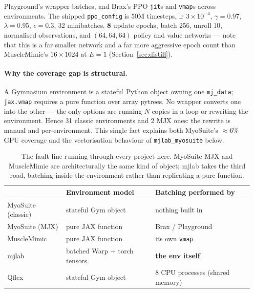 \documentclass[11pt,a4paper]{article}
\begin{document}
\noindent
Playground's wrapper batches, and Brax's PPO \texttt{jit}s and \texttt{vmap}s across
environments. The shipped \texttt{ppo\_config} is 50M timesteps, lr $3\times10^{-4}$,
$\gamma=0.97$, $\lambda=0.95$, $\epsilon=0.3$, 32 minibatches, \textbf{8} update epochs,
batch 256, unroll 10, normalised observations, and $(64,64,64)$ policy and value networks
--- note that this is a far smaller network and a far more aggressive epoch count than
MuscleMimic's $16\times1024$ at $E=1$ (Section~\ref{sec:distill}).

\paragraph{Why the coverage gap is structural.} A Gymnasium environment is a stateful Python
object owning one \texttt{mj\_data}; \texttt{jax.vmap} requires a pure function over array
pytrees. No wrapper converts one into the other --- the only options are running $N$ copies
in a loop or rewriting the environment. Hence 31 classic environments and 2 MJX ones: the
rewrite is manual and per-environment. This single fact explains both MyoSuite's $\approx$6\%
GPU coverage and the vectorisation behaviour of \texttt{mjlab\_myosuite} below.

\begin{table}[h!]
\centering
\small
\begin{tabular}{@{}L{4.2cm}L{4.4cm}L{4.0cm}@{}}
\toprule
 & Environment model & Batching performed by \\
\midrule
MyoSuite (classic)   & stateful Gym object & nothing built in \\
MyoSuite (MJX)       & pure JAX function & Brax / Playground \\
\textcolor{mmC}{MuscleMimic} & pure JAX function & its own \texttt{vmap} \\
\textcolor{mjC}{mjlab}       & batched Warp + torch tensors & \textbf{the env itself} \\
\textcolor{qfC}{Qflex}       & stateful Gym object & 8 CPU processes (shared memory) \\
\bottomrule
\end{tabular}
\caption{The fault line running through every project here. MyoSuite-MJX and MuscleMimic are
architecturally the same kind of object; mjlab takes the third road, batching inside the
environment rather than replicating a pure function.}
\end{table}

\end{document}
